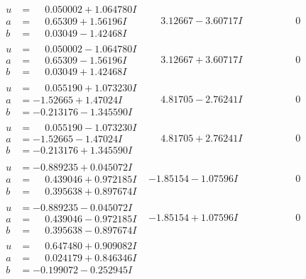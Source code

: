 \documentclass[1p]{elsarticle_modified}
\theoremstyle{definition}
\begin{document}
$$\begin{array}{c|c|c}
\begin{aligned}
u &= \phantom{-}0.050002 + 1.064780 I \\
a &= \phantom{-}0.65309 + 1.56196 I \\
b &= \phantom{-}0.03049 - 1.42468 I\end{aligned}
 & \phantom{-}3.12667 - 3.60717 I & \phantom{-0.000000 } 0 \\ \hline\begin{aligned}
u &= \phantom{-}0.050002 - 1.064780 I \\
a &= \phantom{-}0.65309 - 1.56196 I \\
b &= \phantom{-}0.03049 + 1.42468 I\end{aligned}
 & \phantom{-}3.12667 + 3.60717 I & \phantom{-0.000000 } 0 \\ \hline\begin{aligned}
u &= \phantom{-}0.055190 + 1.073230 I \\
a &= -1.52665 + 1.47024 I \\
b &= -0.213176 - 1.345590 I\end{aligned}
 & \phantom{-}4.81705 - 2.76241 I & \phantom{-0.000000 } 0 \\ \hline\begin{aligned}
u &= \phantom{-}0.055190 - 1.073230 I \\
a &= -1.52665 - 1.47024 I \\
b &= -0.213176 + 1.345590 I\end{aligned}
 & \phantom{-}4.81705 + 2.76241 I & \phantom{-0.000000 } 0 \\ \hline\begin{aligned}
u &= -0.889235 + 0.045072 I \\
a &= \phantom{-}0.439046 + 0.972185 I \\
b &= \phantom{-}0.395638 + 0.897674 I\end{aligned}
 & -1.85154 - 1.07596 I & \phantom{-0.000000 } 0 \\ \hline\begin{aligned}
u &= -0.889235 - 0.045072 I \\
a &= \phantom{-}0.439046 - 0.972185 I \\
b &= \phantom{-}0.395638 - 0.897674 I\end{aligned}
 & -1.85154 + 1.07596 I & \phantom{-0.000000 } 0 \\ \hline\begin{aligned}
u &= \phantom{-}0.647480 + 0.909082 I \\
a &= \phantom{-}0.024179 + 0.846346 I \\
b &= -0.199072 - 0.252945 I\end{aligned}

\end{array}$$
\end{document}
